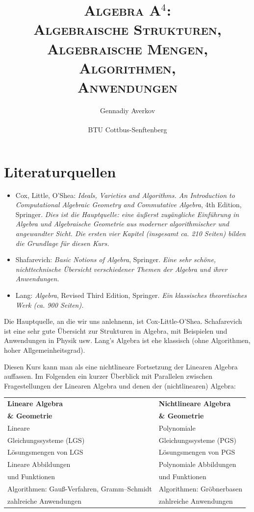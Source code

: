 \documentclass[11pt]{article}
\title{\textsc{Algebra A${}^4$: 
		\\ Algebraische Strukturen, 
		\\ Algebraische Mengen, 
		\\ Algorithmen, 
		\\ Anwendungen}}
\author{Gennadiy Averkov
\\
\\ BTU Cottbus-Senftenberg}
\numberwithin{equation}{section}
\begin{document}
\maketitle


\clearpage 

\tableofcontents

\clearpage

\section*{Literaturquellen}


\begin{itemize}
	\item Cox, Little, O'Shea: \emph{Ideals, Varieties and Algorithms. An Introduction to Computational Algebraic Geometry and Commutative Algebra}, 4th Edition, Springer. \emph{Dies ist die Hauptquelle: eine äußerst zugängliche Einführung in Algebra und Algebraische Geometrie aus moderner algorithmischer und angewandter Sicht. Die ersten vier Kapitel (insgesamt ca. 210 Seiten) bilden die Grundlage für diesen Kurs.}
	\item Shafarevich: \emph{Basic Notions of Algebra}, Springer. \emph{Eine sehr schöne, nichttechnische Übersicht verschiedener Themen der Algebra und ihrer Anwendungen.}
	\item Lang: \emph{Algebra}, Revised Third Edition, Springer.  \emph{Ein klassisches theoretisches Werk (ca. 900 Seiten).} 
\end{itemize} 

Die Hauptquelle, an die wir uns anlehnenn, ist Cox-Little-O'Shea. Schafarevich ist eine sehr gute Übersicht zur Strukturen in Algebra, mit Beispielen und Anwendungen in Physik usw. Lang's Algebra ist ehe klassisch (ohne Algorithmen, hoher Allgemeinheitsgrad). 


\clearpage 

Diesen Kurs kann man als eine nichtlineare Fortsetzung der Linearen Algebra auffassen. Im Folgenden ein kurzer Überblick mit Parallelen zwischen Fragestellungen der Linearen Algebra und denen der (nichtlinearen) Algebra:

\begin{center} 
	\begin{tabular}{l|l}
		\textbf{Lineare Algebra} & \textbf{Nichtlineare Algebra}
		\\ \textbf{\& Geometrie} & \textbf{\& Geometrie} 
		\\ \hline\hline 
		Lineare  & Polynomiale 
		\\ Gleichungssysteme (LGS) & Gleichungssysteme (PGS) 
		\\ \hline 
		Lösungsmengen von LGS & Lösungsmengen von PGS
		\\ \hline 
		Lineare Abbildungen  & Polynomiale Abbildungen
		\\ und Funktionen &  und Funktionen 
		\\ \hline 
		Algorithmen: Gauß-Verfahren, Gramm–Schmidt & Algorithmen: Gröbnerbasen 
		\\ \hline 
		zahlreiche Anwendungen & zahlreiche Anwendungen 
	\end{tabular}  
\end{center} 
\end{document}
